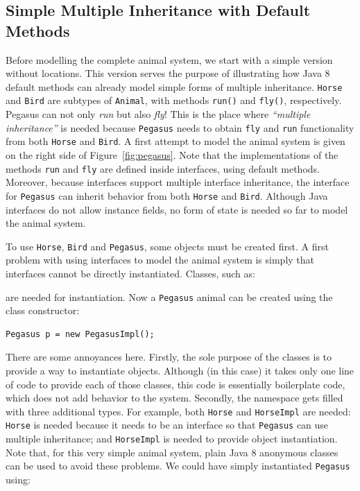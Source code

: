 \subsection{Simple Multiple Inheritance with Default
  Methods}\label{sec:simple}

Before modelling the complete animal system, we  start with a
simple version without locations. This version serves the purpose of illustrating how
Java 8 default methods can already model simple forms of multiple inheritance.
\texttt{Horse} and \texttt{Bird} are subtypes
of \texttt{Animal}, with methods \texttt{run()} and \texttt{fly()},
respectively. Pegasus can not only \emph{run} but also \emph{fly}! This is the
place where \emph{``multiple inheritance''} is needed because
\texttt{Pegasus} needs to obtain \texttt{fly} and \texttt{run}
functionality from both \texttt{Horse} and \texttt{Bird}.
A first attempt to model the animal system is given on the right side
of Figure~\ref{fig:pegasus}.
Note that the implementations of the methods \texttt{run}
and \texttt{fly} are defined inside interfaces, using default
methods. Moreover, because interfaces support multiple interface
inheritance, the interface for \texttt{Pegasus} can inherit behavior
from both \texttt{Horse} and \texttt{Bird}. Although Java interfaces
do not allow instance fields, no form of state is needed so far to
model the animal system.

To use \texttt{Horse}, \texttt{Bird} and \texttt{Pegasus}, some
objects must be created first. A first problem with using
interfaces to model the animal system is simply that interfaces
cannot be directly instantiated. Classes, such as:


\noindent are needed for instantiation. Now a \texttt{Pegasus} animal can be created
using the class constructor:

\begin{lstlisting}
Pegasus p = new PegasusImpl();
\end{lstlisting}

\noindent There are some annoyances here. Firstly, the sole
purpose of the classes is to provide a way to instantiate
objects. Although (in this case) it takes only one line of code to
provide each of those classes, this code is essentially boilerplate
code, which does not add behavior to the system. Secondly,
the namespace gets filled with three additional types. For example,
both \texttt{Horse} and \texttt{HorseImpl} are needed: \texttt{Horse}
is needed because it needs to be an interface so that \texttt{Pegasus}
can use multiple inheritance; and \texttt{HorseImpl} is needed to
provide object instantiation.
Note that, for this very simple animal system, plain Java 8 anonymous
classes can be used to avoid these problems.  We could have simply
instantiated \texttt{Pegasus} using:

